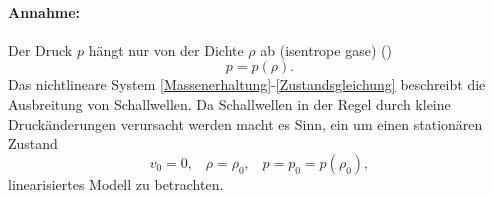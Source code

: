 \paragraph{Annahme:} Der Druck \(p\) hängt nur von der Dichte \(\rho\) ab (isentrope gase) ()
\begin{equation}
	\label{Zustandsgleichung}
	p = p(\rho).
\end{equation}
Das nichtlineare System \eqref{Massenerhaltung}-\eqref{Zustandsgleichung} beschreibt die Ausbreitung von Schallwellen. Da Schallwellen in der Regel durch kleine Druckänderungen verursacht werden macht es Sinn, ein um einen stationären Zustand
\begin{equation*}
	\tag{konstant}
	v_0=0,\;\;\;\rho=\rho_0,\;\;\;p=p_0=p(\rho_0),
\end{equation*}
linearisiertes Modell zu betrachten.

